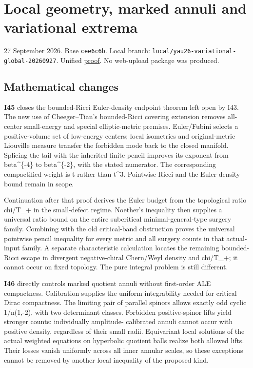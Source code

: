 \documentclass[
  10pt,
]{article}
\begin{document}
\hypertarget{local-geometry-marked-annuli-and-variational-extrema}{%
\section{Local geometry, marked annuli and variational
extrema}\label{local-geometry-marked-annuli-and-variational-extrema}}

27 September 2026. Base \texttt{cee6c6b}. Local branch:
\nolinkurl{local/yau26-variational-global-20260927}. Unified
\href{../continuation/20260927_local_geometry_and_variational_extrema.md}{proof}.
No web-upload package was produced.

\hypertarget{mathematical-changes-3}{%
\subsection{Mathematical changes}\label{mathematical-changes-3}}

\textbf{I45} closes the bounded-Ricci Euler-density endpoint theorem
left open by I43. The new use of Cheeger--Tian's bounded-Ricci covering
extension removes all-center small-energy and special elliptic-metric
premises. Euler/Fubini selects a positive-volume set of low-energy
centers; local isometries and original-metric Liouville measure transfer
the forbidden mode back to the closed manifold. Splicing the tail with
the inherited finite pencil improves its exponent from beta\^{}\{-4\} to
beta\^{}\{-2\}, with the stated numerator. The corresponding
compactified weight is t rather than t\^{}3. Pointwise Ricci and the
Euler-density bound remain in scope.

Continuation after that proof derives the Euler budget from the
topological ratio chi/T\_+ in the small-defect regime. Noether's
inequality then supplies a universal ratio bound on the entire
subcritical minimal-general-type surgery family. Combining with the old
critical-band obstruction proves the universal pointwise pencil
inequality for every metric and all surgery counts in that actual-input
family. A separate characteristic calculation locates the remaining
bounded-Ricci escape in divergent negative-chiral Chern/Weyl density and
chi/T\_+; it cannot occur on fixed topology. The pure integral problem
is still different.

\textbf{I46} directly controls marked quotient annuli without
first-order ALE compactness. Calibration supplies the uniform
integrability needed for critical Dirac compactness. The limiting pair
of parallel spinors allows exactly odd cyclic 1/n(1,-2), with two
determinant classes. Forbidden positive-spinor lifts yield stronger
counts: individually amplitude- calibrated annuli cannot occur with
positive density, regardless of their small radii. Equivariant local
solutions of the actual weighted equations on hyperbolic quotient balls
realize both allowed lifts. Their losses vanish uniformly across all
inner annular scales, so these exceptions cannot be removed by another
local inequality of the proposed kind.
\end{document}
